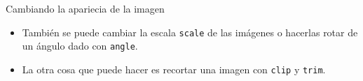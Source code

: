 \documentclass[12pt]{beamer}
\begin{document}
\begin{frame}{Cambiando la apariecia de la imagen}
  \begin{itemize}
    \item También se puede cambiar la escala \texttt{\color{blue}scale} de las imágenes o hacerlas rotar de un ángulo dado con \texttt{\color{blue}angle}.
    \item<2-> La otra cosa que puede hacer es recortar una imagen con \texttt{\color{blue}clip} y \texttt{\color{blue}trim}.    
  \end{itemize}
\end{frame}
\end{document}
